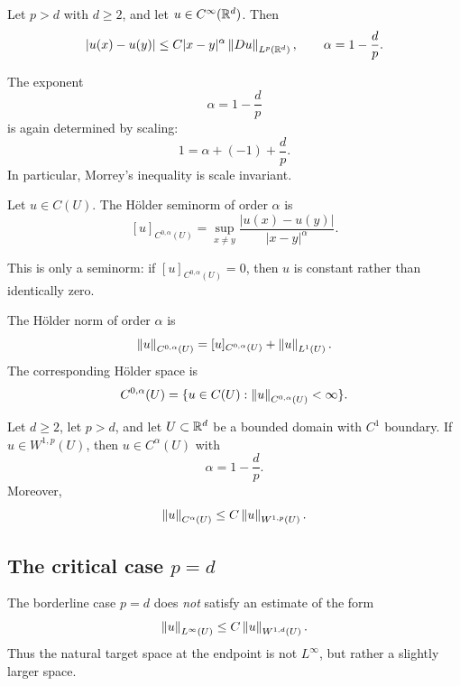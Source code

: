 \begin{theorem}
Let $p>d$ with $d\ge 2$, and let $u\in C^\infty(\mathbb{R}^d)$. Then
\[
|u(x)-u(y)| \le C|x-y|^\alpha \left\lVert Du \right\rVert_{L^p(\mathbb{R}^d)},
\qquad \alpha = 1-\frac{d}{p}.
\]
\end{theorem}

\begin{remark}
The exponent
\[
\alpha = 1-\frac{d}{p}
\]
is again determined by scaling:
\[
1=\alpha + (-1)+\frac{d}{p}.
\]
In particular, Morrey's inequality is scale invariant.
\end{remark}

\begin{definition}
Let $u\in C(U)$. The H\"older seminorm of order $\alpha$ is
\[
[u]_{C^{0,\alpha}(U)} = \sup_{x\ne y} \frac{|u(x)-u(y)|}{|x-y|^\alpha}.
\]
\end{definition}

\begin{remark}
This is only a seminorm: if $[u]_{C^{0,\alpha}(U)}=0$, then $u$ is constant rather than identically zero.
\end{remark}

\begin{definition}
The H\"older norm of order $\alpha$ is
\[
\left\lVert u \right\rVert_{C^{0,\alpha}(U)} = [u]_{C^{0,\alpha}(U)} + \left\lVert u \right\rVert_{L^1(U)}.
\]
The corresponding H\"older space is
\[
C^{0,\alpha}(U)=\{u\in C(U): \left\lVert u \right\rVert_{C^{0,\alpha}(U)}<\infty\}.
\]
\end{definition}

\begin{theorem}
Let $d\ge 2$, let $p>d$, and let $U\subset \mathbb{R}^d$ be a bounded domain with $C^1$ boundary. If $u\in W^{1,p}(U)$, then $u\in C^\alpha(U)$ with
\[
\alpha = 1-\frac{d}{p}.
\]
Moreover,
\[
\left\lVert u \right\rVert_{C^\alpha(U)} \le C\left\lVert u \right\rVert_{W^{1,p}(U)}.
\]
\end{theorem}

\subsection{The critical case $p=d$}

\begin{remark}
The borderline case $p=d$ does \emph{not} satisfy an estimate of the form
\[
\left\lVert u \right\rVert_{L^\infty(U)} \le C\left\lVert u \right\rVert_{W^{1,d}(U)}.
\]
Thus the natural target space at the endpoint is not $L^\infty$, but rather a slightly larger space.
\end{remark}

